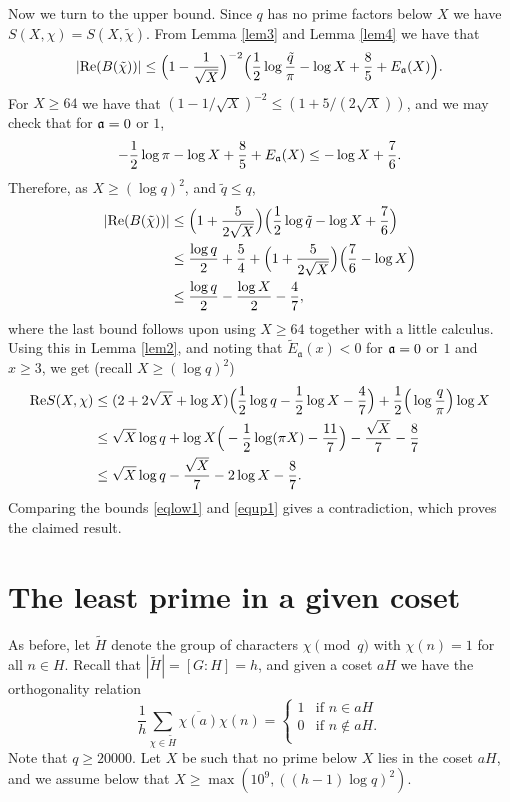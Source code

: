\documentclass [12pt]{amsart}
\numberwithin{equation}{section}
\newcommand{\af}{\mathfrak{a}}
\newcommand{\tRe}{\textup{Re}}
\begin{document}
Now we turn to the upper bound.   Since $q$ has no prime factors below $X$ 
we have $S(X,\chi) = S(X,\tilde \chi)$.   
From Lemma \ref{lem3} and Lemma \ref{lem4} we have that 
$$ 
|\tRe (B(\tilde \chi))| \le \Big(1-\frac{1}{\sqrt{X}}\Big)^{-2} \Big( \frac 12 \log \frac {\tilde q}\pi - \log X + 
\frac{8}{5}
+ E_{\frak a}(X)\Big).  
$$ 
For $X\ge 64$ we have that $(1-1/\sqrt{X})^{-2} \le (1+5/(2\sqrt{X}))$, and we 
may check that for ${\frak a}=0$ or $1$, 
$$ 
-\frac 12 \log \pi -\log X +\frac 85 +E_{\frak a}(X) \le -\log X + \frac 76.
$$
Therefore, as $X\ge (\log q)^2$, and $\tilde q\le q$,
\begin{align*}
|\tRe (B(\tilde \chi))| &\le \Big( 1+ \frac{5}{2\sqrt{X}}\Big) \Big( \frac 12 \log \tilde q - \log X + \frac 76\Big) 
\\
&\le \frac {\log q}{2} +\frac 54 + \Big(1+\frac{5}{2\sqrt{X}}\Big) \Big(\frac 76- \log X\Big)\\
&\le \frac{\log q}{2} -\frac{\log X}{2} - \frac{4}{7}, 
\end{align*}
where the last bound follows upon using $X\ge 64$ together with a little calculus.
Using this in Lemma \ref{lem2}, and noting that $\tilde{E}_\af(x) < 0$ for $\frak a=0$ or $1$ and 
$x\ge 3$, we get  (recall $X\geq (\log q)^2$)
\begin{align} \label{equp1}
\tRe S(X,\chi)
&\le  (2+2\sqrt{X} + \log X) \Big( \frac 12 \log q -\frac 12\log X -\frac 47\Big) + \frac 12 \Big(\log \frac q\pi \Big) \log X \notag \\
&\le \sqrt{X}\log q + \log X\Big( - \frac 12\log (\pi X) -\frac {11}{7} \Big) 
-\frac {\sqrt{X}}7  - \frac 87 \notag\\
&\le \sqrt{X}\log q-\frac{\sqrt{X}}{7}-2\log X-\frac{8}{7}.
\end{align}
Comparing the bounds \eqref{eqlow1} and \eqref{equp1}  gives 
a contradiction, which proves the claimed result.  
 
 \section{The least prime in a given coset}  
  \noindent  As before, let ${\tilde H}$ denote the group of characters 
 $\chi \pmod q$ with $\chi(n)=1$ for all $n\in H$.  Recall that $|\tilde H|=
 [G:H]=h$, and given a coset $aH$ we have the orthogonality relation 
 \begin{equation}
 \label{cosorth}
 \frac 1h \sum_{\chi \in {\tilde H}} \overline{\chi(a)} \chi(n) 
 = \begin{cases}
 1 &\text{if  } n\in aH \\ 
 0 &\text{if  } n\notin aH.\\
 \end{cases}
 \end{equation}
Note that $q\geq 20000$.  Let $X$ be such that no prime below $X$ lies in the coset $aH$, and we assume below that $X\ge \max(10^9, ((h-1)\log q)^2)$.    
\end{document}
